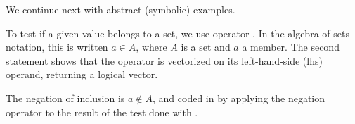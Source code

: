 \documentclass[krantz2]{krantz}\usepackage{knitr}
\begin{document}
We continue next with abstract (symbolic) examples.

\begin{knitrout}\footnotesize
{}\color{fgcolor}\begin{kframe}
\begin{alltt}
 \hlkwb{<-} \hlstd{(}\hlstd{,} \hlstd{,} \hlstd{,} \hlstd{)}
\end{alltt}
\end{kframe}
\end{knitrout}

To test if a given value belongs to a set, we use operator . In the algebra of sets notation, this is written $a \in A$, where $A$ is a set and $a$ a member. The second statement shows that the  operator is vectorized on its left-hand-side (lhs) operand, returning a logical vector.

\begin{knitrout}\footnotesize
{}\color{fgcolor}
\end{knitrout}

The negation of inclusion is $a \not\in A$, and coded in \Rlang by applying the negation operator \Roperator{!} to the result of the test done with .

\begin{knitrout}\footnotesize
{}\color{fgcolor}
\end{knitrout}
\end{document}
